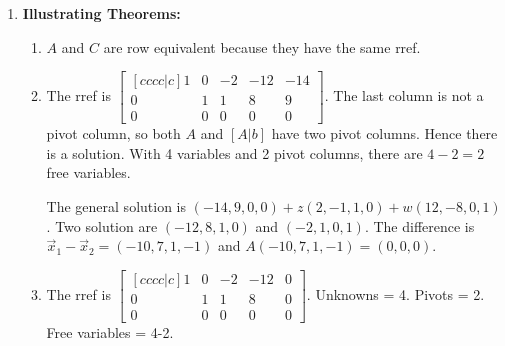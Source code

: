 {\begin{multicols}{2}
\begin{enumerate}
\begin{enumerate}
	Column space basis: $\{(1,2,-1),(2,4,3)\}$. 
	
	Row space basis: 
	$\{(1,0, -\frac{4}{5}, \frac{9}{5}),
	( 0 , 1 , \frac{2}{5}, \frac{3}{5})\}$. 
	
	Coord. of $(1,2,-1)$ are $(1,0)$. 
	
	Coord. of $(2,4,3)$ are $(0,1)$.  
	
	Coord. of $(0,0,2)$ are $(-4/5, 2/5)$.  
	
	Coord. of $(3,6,0)$ are $(9/5,4/5)$.
	
	
	\item The product is the identity either way. Hence $B$ satisfies the definition of being the identity, $AB=BA=I$.

	\item 
$A\vec x_1 =(-1,1,0)=1\vec x_1$ so $\lambda =1$; 

$A\vec x_2=(16,14,3)\neq \lambda \vec x_2$ so not an eigenvector; 

$A\vec x_3=(3,3,0)=3\vec x_3$ so $\lambda = 3$;

$A\vec x_4=(-4,0,1) = 1\vec x_4$ so $\lambda =1$;

\end{enumerate}






\item \textbf{Illustrating Theorems:} 

\begin{enumerate}
	\item $A$ and $C$ are row equivalent because they have the same rref.
	
	\item The rref is
	$
	\begin{bmatrix}[cccc|c]
 1 & 0 & -2 & -12 & -14 \\
 0 & 1 & 1 & 8 & 9 \\
 0 & 0 & 0 & 0 & 0
	\end{bmatrix}
  $.  
	The last column is not a pivot column, so both $A$ and $[A|b]$ have two pivot columns. Hence there is a solution. With 4 variables and 2 pivot columns, there are $4-2=2$ free variables. 
	
	The general solution is $(-14,9,0,0)+z(2,-1,1,0)+w(12,-8,0,1)$.  Two solution are $(-12,8,1,0)$ and $(-2,1,0,1)$.  
	The difference is $\vec x_1 - \vec x_2 = (-10,7,1,-1)$ and $A(-10,7,1,-1) = (0,0,0)$.
	
	\item The rref is
	$
	\begin{bmatrix}[cccc|c]
 1 & 0 & -2 & -12 & 0 \\
 0 & 1 & 1 & 8 & 0 \\
 0 & 0 & 0 & 0 & 0
	\end{bmatrix}
  $. 
	Unknowns = 4. Pivots = 2. Free variables = 4-2. 
	

\end{enumerate}
\end{enumerate}
\end{multicols}}
